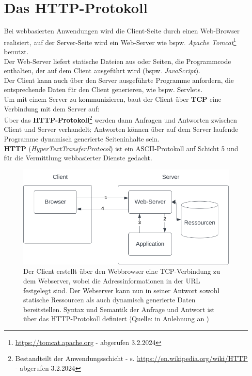\section{Das HTTP-Protokoll}

Bei webbasierten Anwendungen wird die Client-Seite durch einen Web-Browser realisiert, auf der Server-Seite wird ein Web-Server wie bspw. \textit{Apache Tomcat}\footnote{
    \url{https://tomcat.apache.org} - abgerufen 3.2.2024
} benutzt.\\

\noindent
Der Web-Server liefert statische Dateien aus oder Seiten, die Programmcode enthalten, der auf dem Client ausgeführt wird (bspw. \textit{JavaScript}).\\

\noindent
Der Client kann auch über den Server ausgeführte Programme anfordern, die entsprechende Daten für den Client generieren, wie bspw. Servlets.\\

\noindent
Um mit einem Server zu kommunizieren, baut der Client über \textbf{TCP} eine Verbindung mit dem Server auf:\\
Über das \textbf{HTTP-Protokoll}\footnote{
Bestandteilt der Anwendungsschicht - s. \url{https://en.wikipedia.org/wiki/HTTP} - abgerufen 3.2.2024
} werden dann Anfragen und Antworten zwischen Client und Server verhandelt; Antworten können über auf dem Server laufende Programme dynamisch generierte Seiteninhalte sein.\\

\noindent
\textbf{HTTP} (\textit{HyperTextTransferProtocol}) ist ein ASCII-Protokoll auf Schicht 5 und für die Vermittlung webbasierter Dienste gedacht.

\begin{figure}
    \centering
    \includegraphics[scale=0.5]{chapters/fopt6/img/clientserver}
    \caption{Der Client erstellt über den Webbrowser eine TCP-Verbindung zu dem Webserver, wobei die Adressinformationen in der URL festgelegt sind. Der Webserver kann nun in seiner Antwort sowohl statische Ressourcen als auch dynamisch generierte Daten bereitstellen. Syntax und Semantik der Anfrage und Antwort ist über das HTTP-Protokoll definiert (Quelle: in Anlehnung an \cite[402, Bild 8.1]{Oec22})}
    \label{fig:clientserver}
\end{figure}

